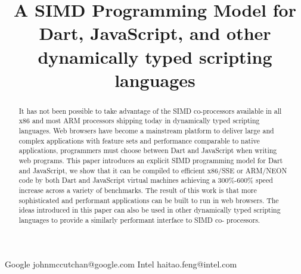 \documentclass[preprint]{sigplanconf}
\begin{document}
\setlength{\pdfpageheight}{\paperheight}
\setlength{\pdfpagewidth}{\paperwidth}






\title{A SIMD Programming Model for Dart, JavaScript, and other dynamically typed scripting languages}

           {Google}
           {johnmccutchan@google.com}
           {Intel}
           {haitao.feng@intel.com}

\maketitle

\begin{abstract}

It has not been possible to take advantage of the SIMD co-processors available
in all x86 and most ARM processors shipping today in dynamically typed scripting
languages. Web browsers have become a mainstream platform to deliver large and
complex applications with feature sets and performance comparable to native
applications, programmers must choose between Dart and JavaScript when writing
web programs. This paper introduces an explicit SIMD programming model for Dart
and JavaScript, we show that it can be compiled to efficient x86/SSE or ARM/NEON
code by both Dart and JavaScript virtual machines achieving a 300\%-600\% speed
increase across a variety of benchmarks. The result of this work is that more
sophisticated and performant applications can be built to run in web browsers.
The ideas introduced in this paper can also be used in other dynamically typed
scripting languages to provide a similarly performant interface to SIMD co-
processors.

\end{abstract}
\end{document}
